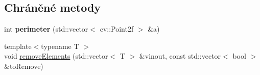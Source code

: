 \subsection*{Chráněné metody}
\begin{DoxyCompactItemize}
\item 
\hypertarget{class_ar_pipe_1_1_detect_polygons_a3b632b18d174e706cdffdd8ae16187fb}{int {\bfseries perimeter} (std\-::vector$<$ cv\-::\-Point2f $>$ \&a)}\label{da/d76/class_ar_pipe_1_1_detect_polygons_a3b632b18d174e706cdffdd8ae16187fb}

\item 
{\footnotesize template$<$typename T $>$ }\\void \hyperlink{class_ar_pipe_1_1_detect_polygons_a5027e25c5bdc3ab0e70f3d4a6c47369d}{remove\-Elements} (std\-::vector$<$ T $>$ \&vinout, const std\-::vector$<$ bool $>$ \&to\-Remove)
\end{DoxyCompactItemize}
